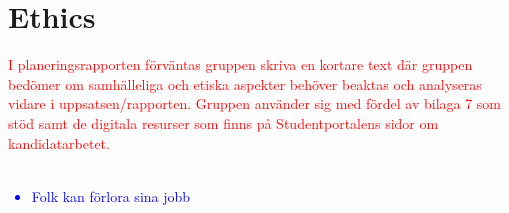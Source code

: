 \section{Ethics}
\textcolor{red}{
I planeringsrapporten förväntas gruppen skriva en kortare text där gruppen bedömer om samhälleliga och etiska aspekter behöver beaktas och analyseras vidare i uppsatsen/rapporten. Gruppen använder sig med fördel av bilaga 7 som stöd samt de digitala resurser som finns på Studentportalens sidor om kandidatarbetet.
}
\\\\
\textcolor{blue}{
\begin{itemize}
    \item Folk kan förlora sina jobb
\end{itemize}
}